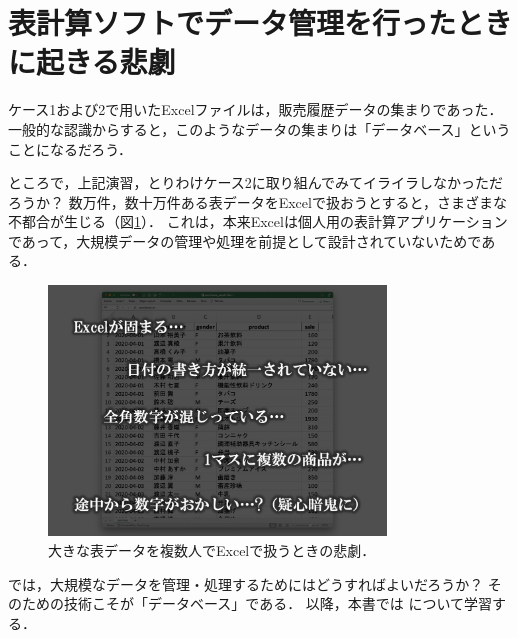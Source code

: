 \section{表計算ソフトでデータ管理を行ったときに起きる悲劇}
ケース1および2で用いたExcelファイルは，販売履歴データの集まりであった．
一般的な認識からすると，このようなデータの集まりは「データベース」ということになるだろう．

ところで，上記演習，とりわけケース2に取り組んでみてイライラしなかっただろうか？
数万件，数十万件ある表データをExcelで扱おうとすると，さまざまな不都合が生じる（図\ref{fig:excel-disaster}）．
これは，本来Excelは個人用の表計算アプリケーションであって，大規模データの管理や処理を前提として設計されていないためである．

\begin{figure}[tb]
    \centering
    \includegraphics[width=0.8\textwidth]{figure/excel-disaster.jpg}
    \caption{大きな表データを複数人でExcelで扱うときの悲劇．}
    \label{fig:excel-disaster}
\end{figure}

では，大規模なデータを管理・処理するためにはどうすればよいだろうか？
そのための技術こそが「データベース」である．
以降，本書では について学習する．

